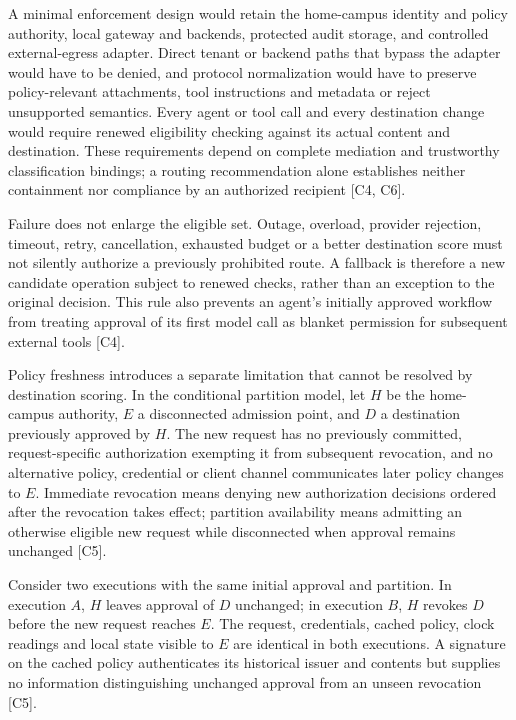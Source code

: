\documentclass[11pt]{article}
\begin{document}
A minimal enforcement design would retain the home-campus identity and policy authority, local gateway and backends, protected audit storage, and controlled external-egress adapter. Direct tenant or backend paths that bypass the adapter would have to be denied, and protocol normalization would have to preserve policy-relevant attachments, tool instructions and metadata or reject unsupported semantics. Every agent or tool call and every destination change would require renewed eligibility checking against its actual content and destination. These requirements depend on complete mediation and trustworthy classification bindings; a routing recommendation alone establishes neither containment nor compliance by an authorized recipient [C4, C6].

Failure does not enlarge the eligible set. Outage, overload, provider rejection, timeout, retry, cancellation, exhausted budget or a better destination score must not silently authorize a previously prohibited route. A fallback is therefore a new candidate operation subject to renewed checks, rather than an exception to the original decision. This rule also prevents an agent\textquoteright{}s initially approved workflow from treating approval of its first model call as blanket permission for subsequent external tools [C4].

Policy freshness introduces a separate limitation that cannot be resolved by destination scoring. In the conditional partition model, let $H$ be the home-campus authority, $E$ a disconnected admission point, and $D$ a destination previously approved by $H$. The new request has no previously committed, request-specific authorization exempting it from subsequent revocation, and no alternative policy, credential or client channel communicates later policy changes to $E$. Immediate revocation means denying new authorization decisions ordered after the revocation takes effect; partition availability means admitting an otherwise eligible new request while disconnected when approval remains unchanged [C5].

Consider two executions with the same initial approval and partition. In execution $A$, $H$ leaves approval of $D$ unchanged; in execution $B$, $H$ revokes $D$ before the new request reaches $E$. The request, credentials, cached policy, clock readings and local state visible to $E$ are identical in both executions. A signature on the cached policy authenticates its historical issuer and contents but supplies no information distinguishing unchanged approval from an unseen revocation [C5].
\end{document}
